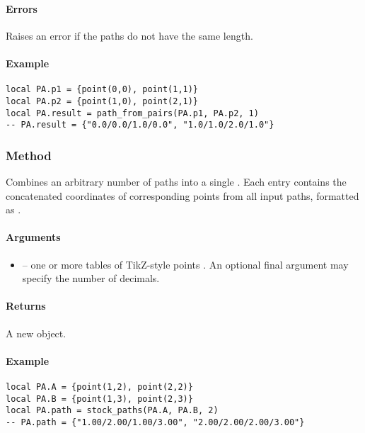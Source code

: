 \paragraph{Errors} Raises an error if the paths do not have the same length.

\paragraph{Example}
\begin{verbatim}
local PA.p1 = {point(0,0), point(1,1)}
local PA.p2 = {point(1,0), point(2,1)}
local PA.result = path_from_pairs(PA.p1, PA.p2, 1)
-- PA.result = {"0.0/0.0/1.0/0.0", "1.0/1.0/2.0/1.0"}
\end{verbatim}



\subsubsection{Method }
\label{ssub:method_tkzmeth_path_stock__paths}

Combines an arbitrary number of paths into a single . Each entry contains the concatenated coordinates of corresponding points from all input paths, formatted as .

\paragraph{Arguments}
\begin{itemize}
  \item {} – one or more tables of TikZ-style points . An optional final argument may specify the number of decimals.
\end{itemize}

\paragraph{Returns} A new  object.

\paragraph{Example}
\begin{verbatim}
local PA.A = {point(1,2), point(2,2)}
local PA.B = {point(1,3), point(2,3)}
local PA.path = stock_paths(PA.A, PA.B, 2)
-- PA.path = {"1.00/2.00/1.00/3.00", "2.00/2.00/2.00/3.00"}
\end{verbatim}


